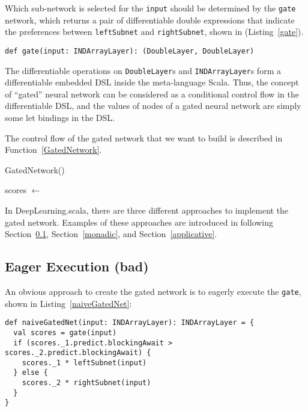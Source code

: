 Which sub-network is selected for the \lstinline{input} should be determined by the \lstinline{gate} network, which returns a pair of differentiable double expressions that indicate the preferences between \lstinline{leftSubnet} and \lstinline{rightSubnet}, shown in (Listing~\ref{gate}).

\begin{lstlisting}[float={h t b p},caption={Predefined gate network},label={gate}]
def gate(input: INDArrayLayer): (DoubleLayer, DoubleLayer)
\end{lstlisting}

The differentiable operations on \lstinline{DoubleLayer}s  and \lstinline{INDArrayLayer}s form a differentiable embedded DSL inside the meta-language Scala. Thus, the concept of ``gated'' neural network can be considered as a conditional control flow in the differentiable DSL, and the values of nodes of a gated neural network are simply some let bindings in the DSL.

The control flow of the gated network that we want to build is described in Function~\ref{GatedNetwork}.

\begin{function}[H]
  \caption{GatedNetwork()\label{GatedNetwork}}
  scores \(\leftarrow\) \;
\end{function}

In DeepLearning.scala, there are three different approaches to implement the gated network. Examples of these approaches are introduced in following Section~\ref{eager}, Section~\ref{monadic}, and Section~\ref{applicative}.

\subsection{Eager Execution (bad)}
\label{eager}

An obvious approach to create the gated network is to eagerly execute the \lstinline{gate}, shown in Listing~\ref{naiveGatedNet}:

\begin{lstlisting}[float={h t b p},caption={The eager execution implementation of gated network}, label={naiveGatedNet}]
def naiveGatedNet(input: INDArrayLayer): INDArrayLayer = {
  val scores = gate(input)
  if (scores._1.predict.blockingAwait > scores._2.predict.blockingAwait) {
    scores._1 * leftSubnet(input)
  } else {
    scores._2 * rightSubnet(input)
  }
}
\end{lstlisting}

